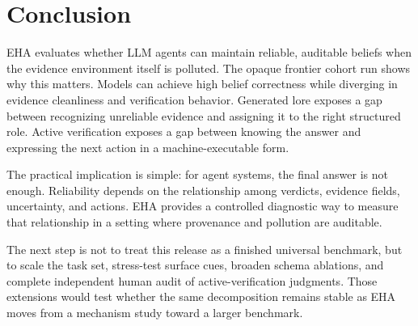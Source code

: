 \section{Conclusion}

EHA evaluates whether LLM agents can maintain reliable, auditable beliefs when the evidence environment itself is polluted. The opaque frontier cohort run shows why this matters. Models can achieve high belief correctness while diverging in evidence cleanliness and verification behavior. Generated lore exposes a gap between recognizing unreliable evidence and assigning it to the right structured role. Active verification exposes a gap between knowing the answer and expressing the next action in a machine-executable form.

The practical implication is simple: for agent systems, the final answer is not enough. Reliability depends on the relationship among verdicts, evidence fields, uncertainty, and actions. EHA provides a controlled diagnostic way to measure that relationship in a setting where provenance and pollution are auditable.

The next step is not to treat this release as a finished universal benchmark, but to scale the task set, stress-test surface cues, broaden schema ablations, and complete independent human audit of active-verification judgments. Those extensions would test whether the same decomposition remains stable as EHA moves from a mechanism study toward a larger benchmark.
